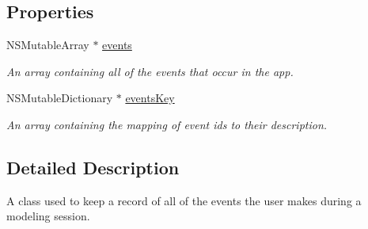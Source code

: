 \subsection*{Properties}
\begin{DoxyCompactItemize}
\item 
\hypertarget{interface_event_logger_a67a1a529ac51538c28ff99617238ebcc}{N\-S\-Mutable\-Array $\ast$ \hyperlink{interface_event_logger_a67a1a529ac51538c28ff99617238ebcc}{events}}\label{interface_event_logger_a67a1a529ac51538c28ff99617238ebcc}

\begin{DoxyCompactList}\small\item\em An array containing all of the events that occur in the app. \end{DoxyCompactList}\item 
\hypertarget{interface_event_logger_a85a7cbe7f3811f03518390b615822105}{N\-S\-Mutable\-Dictionary $\ast$ \hyperlink{interface_event_logger_a85a7cbe7f3811f03518390b615822105}{events\-Key}}\label{interface_event_logger_a85a7cbe7f3811f03518390b615822105}

\begin{DoxyCompactList}\small\item\em An array containing the mapping of event ids to their description. \end{DoxyCompactList}\end{DoxyCompactItemize}


\subsection{Detailed Description}
A class used to keep a record of all of the events the user makes during a modeling session. 

